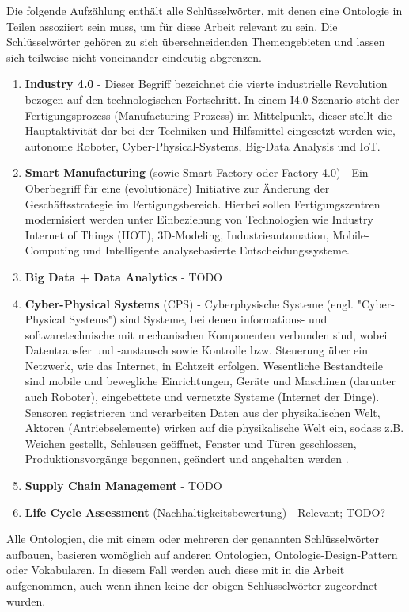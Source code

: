 \documentclass{article}
\begin{document}
Die folgende Aufzählung enthält alle Schlüsselwörter, mit denen eine Ontologie in Teilen assoziiert sein muss, um für diese Arbeit relevant zu sein. Die Schlüsselwörter gehören zu sich überschneidenden Themengebieten und lassen sich teilweise nicht voneinander eindeutig abgrenzen.

\begin{enumerate}
    \item \textbf{Industry 4.0} - Dieser Begriff bezeichnet die vierte industrielle Revolution bezogen auf den technologischen Fortschritt. In einem I4.0 Szenario steht der Fertigungsprozess (Manufacturing-Prozess) im Mittelpunkt, dieser stellt die Hauptaktivität dar bei der Techniken und Hilfsmittel eingesetzt werden wie, autonome Roboter, Cyber-Physical-Systems, Big-Data Analysis und IoT.
    \item \textbf{Smart Manufacturing} (sowie Smart Factory oder Factory 4.0) - Ein Oberbegriff für eine (evolutionäre) Initiative zur Änderung der Geschäftsstrategie im Fertigungsbereich. Hierbei sollen Fertigungszentren modernisiert werden unter Einbeziehung von Technologien wie Industry Internet of Things (IIOT), 3D-Modeling, Industrieautomation, Mobile-Computing und Intelligente analysebasierte Entscheidungssysteme.
    \item \textbf{Big Data + Data Analytics} - TODO
    \item \textbf{Cyber-Physical Systems} (CPS) - Cyberphysische Systeme (engl. "Cyber-Physical Systems") sind Systeme, bei denen informations- und softwaretechnische mit mechanischen Komponenten verbunden sind, wobei Datentransfer und -austausch sowie Kontrolle bzw. Steuerung über ein Netzwerk, wie das Internet, in Echtzeit erfolgen. Wesentliche Bestandteile sind mobile und bewegliche Einrichtungen, Geräte und Maschinen (darunter auch Roboter), eingebettete und vernetzte Systeme (Internet der Dinge). Sensoren registrieren und verarbeiten Daten aus der physikalischen Welt, Aktoren (Antriebselemente) wirken auf die physikalische Welt ein, sodass z.B. Weichen gestellt, Schleusen geöffnet, Fenster und Türen geschlossen, Produktionsvorgänge begonnen, geändert und angehalten werden \cite{GablerCPS2024}.
    \item \textbf{Supply Chain Management} - TODO
    \item \textbf{Life Cycle Assessment} (Nachhaltigkeitsbewertung) - Relevant; TODO?
\end{enumerate}

Alle Ontologien, die mit einem oder mehreren der genannten Schlüsselwörter aufbauen, basieren womöglich auf anderen Ontologien, Ontologie-Design-Pattern oder Vokabularen. In diesem Fall werden auch diese mit in die Arbeit aufgenommen, auch wenn ihnen keine der obigen Schlüsselwörter zugeordnet wurden.
\end{document}

